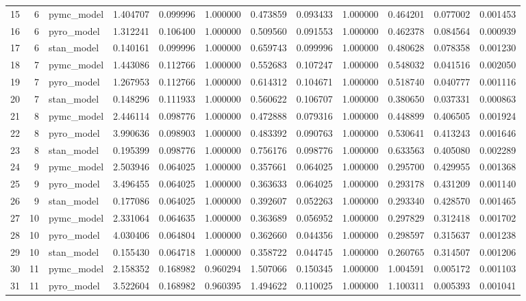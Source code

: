 \begin{tabular}{lrlrrrrrrrrr}
15 & 6 & pymc_model & 1.404707 & 0.099996 & 1.000000 & 0.473859 & 0.093433 & 1.000000 & 0.464201 & 0.077002 & 0.001453 \\
16 & 6 & pyro_model & 1.312241 & 0.106400 & 1.000000 & 0.509560 & 0.091553 & 1.000000 & 0.462378 & 0.084564 & 0.000939 \\
17 & 6 & stan_model & 0.140161 & 0.099996 & 1.000000 & 0.659743 & 0.099996 & 1.000000 & 0.480628 & 0.078358 & 0.001230 \\
18 & 7 & pymc_model & 1.443086 & 0.112766 & 1.000000 & 0.552683 & 0.107247 & 1.000000 & 0.548032 & 0.041516 & 0.002050 \\
19 & 7 & pyro_model & 1.267953 & 0.112766 & 1.000000 & 0.614312 & 0.104671 & 1.000000 & 0.518740 & 0.040777 & 0.001116 \\
20 & 7 & stan_model & 0.148296 & 0.111933 & 1.000000 & 0.560622 & 0.106707 & 1.000000 & 0.380650 & 0.037331 & 0.000863 \\
21 & 8 & pymc_model & 2.446114 & 0.098776 & 1.000000 & 0.472888 & 0.079316 & 1.000000 & 0.448899 & 0.406505 & 0.001924 \\
22 & 8 & pyro_model & 3.990636 & 0.098903 & 1.000000 & 0.483392 & 0.090763 & 1.000000 & 0.530641 & 0.413243 & 0.001646 \\
23 & 8 & stan_model & 0.195399 & 0.098776 & 1.000000 & 0.756176 & 0.098776 & 1.000000 & 0.633563 & 0.405080 & 0.002289 \\
24 & 9 & pymc_model & 2.503946 & 0.064025 & 1.000000 & 0.357661 & 0.064025 & 1.000000 & 0.295700 & 0.429955 & 0.001368 \\
25 & 9 & pyro_model & 3.496455 & 0.064025 & 1.000000 & 0.363633 & 0.064025 & 1.000000 & 0.293178 & 0.431209 & 0.001140 \\
26 & 9 & stan_model & 0.177086 & 0.064025 & 1.000000 & 0.392607 & 0.052263 & 1.000000 & 0.293340 & 0.428570 & 0.001465 \\
27 & 10 & pymc_model & 2.331064 & 0.064635 & 1.000000 & 0.363689 & 0.056952 & 1.000000 & 0.297829 & 0.312418 & 0.001702 \\
28 & 10 & pyro_model & 4.030406 & 0.064804 & 1.000000 & 0.362660 & 0.044356 & 1.000000 & 0.298597 & 0.315637 & 0.001238 \\
29 & 10 & stan_model & 0.155430 & 0.064718 & 1.000000 & 0.358722 & 0.044745 & 1.000000 & 0.260765 & 0.314507 & 0.001206 \\
30 & 11 & pymc_model & 2.158352 & 0.168982 & 0.960294 & 1.507066 & 0.150345 & 1.000000 & 1.004591 & 0.005172 & 0.001103 \\
31 & 11 & pyro_model & 3.522604 & 0.168982 & 0.960395 & 1.494622 & 0.110025 & 1.000000 & 1.100311 & 0.005393 & 0.001041 \\

\end{tabular}
